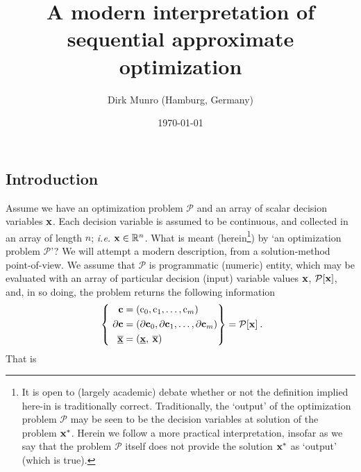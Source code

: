 \documentclass[11pt]{article}
\title{A modern interpretation of sequential approximate optimization}
\author{Dirk Munro (Hamburg, Germany)}
\date{\today }
\begin{document}
\maketitle

\subsection{Introduction}

Assume we have an optimization problem $\mathcal{P}$ and an array of scalar decision variables $\mathbf{x}$. Each decision variable is assumed to be continuous, and collected in an array of length $n$; \emph{i.e.} $\mathbf{x} \in \mathbb{R}^n$. What is meant (herein\footnote{It is open to (largely academic) debate whether or not the definition implied here-in is traditionally correct. Traditionally, the `output' of the optimization problem $\mathcal{P}$ may be seen to be the decision variables at solution of the problem $\mathbf{x}^\ast$. Herein we follow a more practical interpretation, insofar as we say that the problem $\mathcal{P}$ itself does not provide the solution $\mathbf{x}^\ast$ as `output' (which is true).}) by `an optimization problem $\mathcal{P}$'? We will attempt a modern description, from a solution-method point-of-view. We assume that $\mathcal{P}$ is programmatic (numeric) entity, which may be evaluated with an array of particular decision (input) variable values $\mathbf{x}$, $\mathcal{P}[\mathbf{x}]$, and, in so doing, the problem returns the following information
\begin{align}
\label{d:eqn:p}
 ~\left\{ ~
\begin{aligned}
\mathbf{c} &= (\textrm{c}_0, \textrm{c}_1, \ldots, \textrm{c}_m ) \\
\mathbf{\partial c} & = (\mathbf{\partial c}_0 , \mathbf{\partial c}_1 , \ldots,\mathbf{\partial c}_m  ) \\ \underline{\overline{\mathbf{x}}} & = ( \underline{\mathbf{x}} , \: \overline{\mathbf{x}} ) \:
\end{aligned}\right\} =
\mathcal{P} [\mathbf{x}] \: .
\end{align}
That is 
\end{document}

